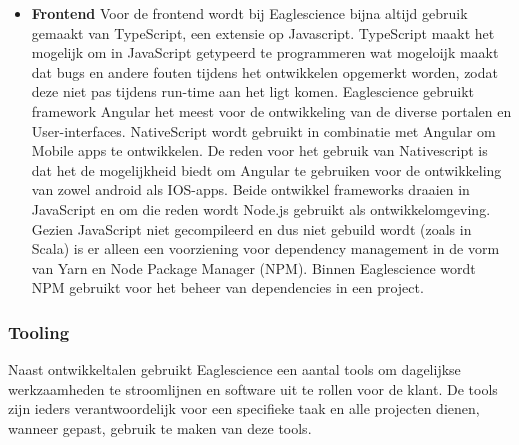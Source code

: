 \begin{itemize}
    \item \textbf{Frontend}
    Voor de frontend wordt bij Eaglescience bijna altijd gebruik gemaakt van TypeScript, een extensie op Javascript. TypeScript maakt het mogelijk om in JavaScript getypeerd te programmeren wat mogeloijk maakt dat bugs en andere fouten tijdens het ontwikkelen opgemerkt worden, zodat deze niet pas tijdens run-time aan het ligt komen. Eaglescience gebruikt framework Angular het meest voor de ontwikkeling van de diverse portalen en User-interfaces. NativeScript wordt gebruikt in combinatie met Angular om Mobile apps te ontwikkelen. De reden voor het gebruik van Nativescript is dat het de mogelijkheid biedt om Angular te gebruiken voor de ontwikkeling van zowel android als IOS-apps. Beide ontwikkel frameworks draaien in JavaScript en om die reden wordt Node.js gebruikt als ontwikkelomgeving. Gezien JavaScript niet gecompileerd en dus niet gebuild wordt (zoals in Scala) is er alleen een voorziening voor dependency management in de vorm van Yarn en Node Package Manager (NPM). Binnen Eaglescience wordt NPM gebruikt voor het beheer van dependencies in een project.
\end{itemize}

\subsubsection{Tooling}\label{subsubsec:tooling}
Naast ontwikkeltalen gebruikt Eaglescience een aantal tools om dagelijkse werkzaamheden te stroomlijnen en software uit te rollen voor de klant. De tools zijn ieders verantwoordelijk voor een specifieke taak en alle projecten dienen, wanneer gepast, gebruik te maken van deze tools.

